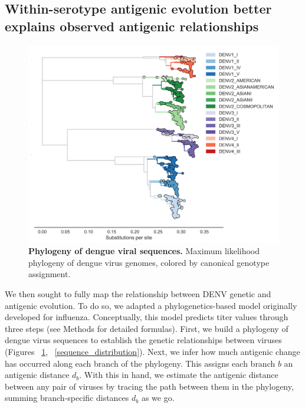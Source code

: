 \documentclass[11pt,oneside,letterpaper]{article}
\begin{document}
\subsection{Within-serotype antigenic evolution better explains observed antigenic relationships}

\begin{figure}[h]
  \begin{centering}
    \includegraphics[width=\linewidth]{../figures/png/genotype_tree.png}
  	\caption{\textbf{Phylogeny of dengue viral sequences.}  Maximum likelihood phylogeny of dengue virus genomes, colored by canonical genotype assignment.}
  	\label{genotype_tree}
  \end{centering}
\end{figure}

We then sought to fully map the relationship between DENV genetic and antigenic evolution.
To do so, we adapted a phylogenetics-based model originally developed for influenza.
Conceptually, this model predicts titer values through three steps (see Methods for detailed formulas).
First, we build a phylogeny of dengue virus sequences to establish the genetic relationships between viruses (Figures ~\ref{genotype_tree}, ~\ref{sequence_distribution}).
Next, we infer how much antigenic change has occurred along each branch of the phylogeny.
This assigns each branch $b$ an antigenic distance $d_b$.
With this in hand, we estimate the antigenic distance between any pair of viruses by tracing the path between them in the phylogeny, summing branch-specific distances $d_b$ as we go.
\end{document}
